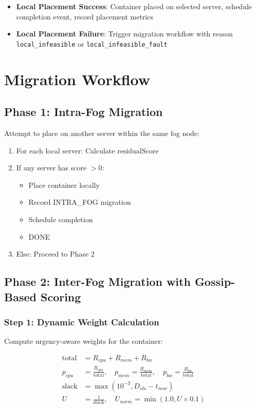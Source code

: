 \documentclass[12pt,a4paper]{article}
\begin{document}
\begin{itemize}
    \item \textbf{Local Placement Success}: Container placed on selected server, schedule completion event, record placement metrics
    \item \textbf{Local Placement Failure}: Trigger migration workflow with reason \texttt{local\_infeasible} or \allowbreak \texttt{local\_infeasible\_fault}
\end{itemize}

\section{Migration Workflow}

\subsection{Phase 1: Intra-Fog Migration}

Attempt to place on another server within the same fog node:
\begin{enumerate}
    \item For each local server: Calculate $\text{residualScore}$
    \item If any server has score $> 0$:
    \begin{itemize}
        \item Place container locally
        \item Record INTRA\_FOG migration
        \item Schedule completion
        \item DONE
    \end{itemize}
    \item Else: Proceed to Phase 2
\end{enumerate}

\subsection{Phase 2: Inter-Fog Migration with Gossip-Based Scoring}

\subsubsection{Step 1: Dynamic Weight Calculation}

Compute urgency-aware weights for the container:

\begin{align}
    \text{total} &= R_{cpu} + R_{mem} + R_{bw} \\
    p_{cpu} &= \frac{R_{cpu}}{\text{total}}, \quad p_{mem} = \frac{R_{mem}}{\text{total}}, \quad p_{bw} = \frac{R_{bw}}{\text{total}} \\
    \text{slack} &= \max(10^{-3}, D_{sla} - t_{now}) \\
    U &= \frac{1}{\text{slack}}, \quad U_{norm} = \min(1.0, U \times 0.1)
\end{align}
\end{document}
